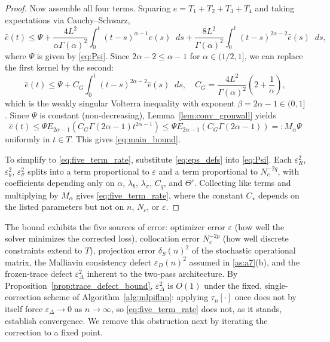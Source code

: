 \documentclass[11pt, a4paper]{article}
\theoremstyle{theoremstyle}
\theoremstyle{definitionstyle}
\newcommand{\dd}{\mathop{}\!d}
\begin{document}
\begin{proof}
    Now assemble all four terms. Squaring $e = T_1 + T_2 + T_3 + T_4$ and taking expectations via Cauchy--Schwarz,
    \begin{equation}
        \hat e(t) \leq \Psi + \frac{4L^2}{\alpha\Gamma(\alpha)^2}\int_0^t (t - s)^{\alpha - 1}\hat e(s)\dd{s} + \frac{8L^2}{\Gamma(\alpha)^2}\int_0^t (t - s)^{2\alpha - 2}\hat e(s)\dd{s},
    \end{equation}
    where $\Psi$ is given by \eqref{eq:Psi}. Since $2\alpha - 2 \leq \alpha - 1$ for $\alpha \in (1/2, 1]$, we can replace the first kernel by the second:
    \begin{equation}
        \hat e(t) \leq \Psi + C_G\int_0^t (t - s)^{2\alpha - 2}\hat e(s)\dd{s}, \quad C_G = \frac{4L^2}{\Gamma(\alpha)^2}\left ( 2 + \frac 1\alpha \right ),
    \end{equation}
    which is the weakly singular Volterra inequality with exponent $\beta = 2\alpha - 1 \in (0,1]$. Since $\Psi$ is constant (non-decreasing), Lemma~\ref{lem:conv_gronwall} yields
    \begin{equation}
        \hat e(t) \leq \Psi E_{2\alpha-1}(C_G\Gamma(2\alpha-1)t^{2\alpha-1}) \leq \Psi E_{2\alpha-1}(C_G\Gamma(2\alpha-1)) =: M_\alpha\Psi
    \end{equation}
    uniformly in $t \in T$. This gives \eqref{eq:main_bound}.

    To simplify to \eqref{eq:five_term_rate}, substitute \eqref{eq:eps_defs} into \eqref{eq:Psi}. Each $\varepsilon_R^2$, $\varepsilon_b^2$, $\varepsilon_\sigma^2$ splits into a term proportional to $\varepsilon$ and a term proportional to $N_c^{-2q}$, with coefficients depending only on $\alpha$, $\lambda_b$, $\lambda_\sigma$, $C_q$, and $\Theta'$. Collecting like terms and multiplying by $M_\alpha$ gives \eqref{eq:five_term_rate}, where the constant $C_\star$ depends on the listed parameters but not on $n$, $N_c$, or $\varepsilon$.
\end{proof}

The bound exhibits the five sources of error: optimizer error $\varepsilon$ (how well the solver minimizes the corrected loss), collocation error $N_c^{-2p}$ (how well discrete constraints extend to $T$), projection error $\delta_S(n)^2$ of the stochastic operational matrix, the Malliavin consistency defect $\varepsilon_D(n)^2$ assumed in \ref{as:a7}(b), and the frozen-trace defect $\varepsilon_\Delta^2$ inherent to the two-pass architecture. By Proposition~\ref{prop:trace_defect_bound}, $\varepsilon_\Delta^2$ is $O(1)$ under the fixed, single-correction scheme of Algorithm~\ref{alg:mlpiflnn}: applying $\tau_n[\cdot]$ once does not by itself force $\varepsilon_\Delta \to 0$ as $n\to\infty$, so \eqref{eq:five_term_rate} does not, as it stands, establish convergence. We remove this obstruction next by iterating the correction to a fixed point.
\end{document}
